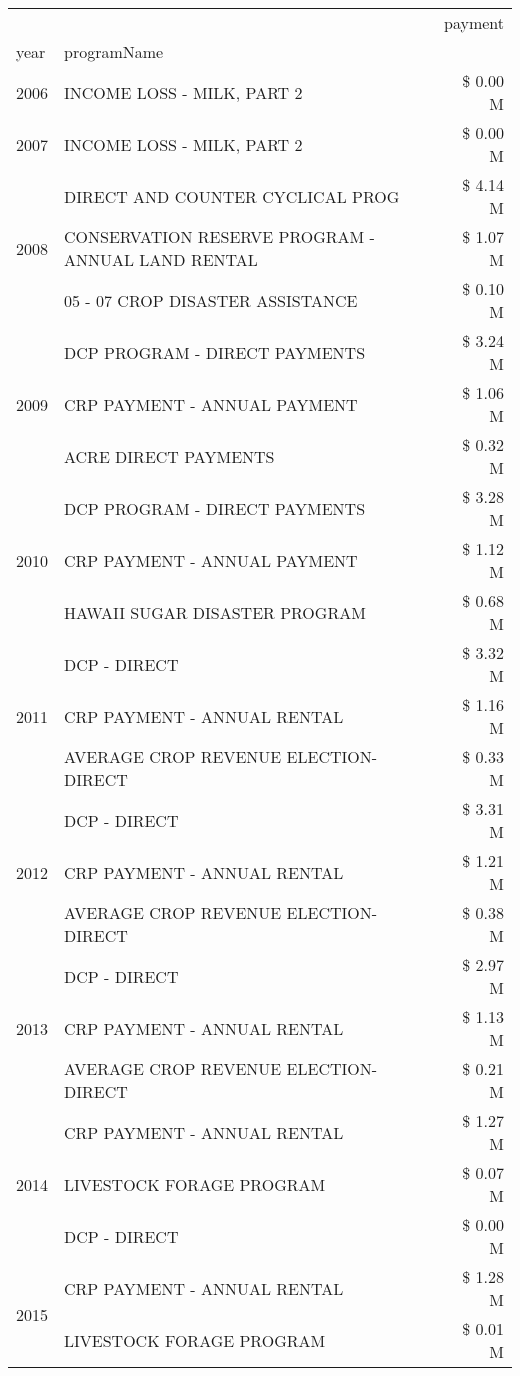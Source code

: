 \begin{tabular}{llr}
\toprule
 &  & payment \\
year & programName &  \\
\midrule
2006 & INCOME LOSS - MILK, PART 2 & \$ 0.00 M \\
\cline{1-3}
2007 & INCOME LOSS - MILK, PART 2 & \$ 0.00 M \\
\cline{1-3}
\multirow[t]{3}{*}{2008} & DIRECT AND COUNTER CYCLICAL PROG & \$ 4.14 M \\
 & CONSERVATION RESERVE PROGRAM - ANNUAL LAND RENTAL & \$ 1.07 M \\
 & 05 - 07 CROP DISASTER ASSISTANCE & \$ 0.10 M \\
\cline{1-3}
\multirow[t]{3}{*}{2009} & DCP PROGRAM - DIRECT PAYMENTS & \$ 3.24 M \\
 & CRP PAYMENT - ANNUAL PAYMENT & \$ 1.06 M \\
 & ACRE DIRECT PAYMENTS & \$ 0.32 M \\
\cline{1-3}
\multirow[t]{3}{*}{2010} & DCP PROGRAM - DIRECT PAYMENTS & \$ 3.28 M \\
 & CRP PAYMENT - ANNUAL PAYMENT & \$ 1.12 M \\
 & HAWAII SUGAR DISASTER PROGRAM & \$ 0.68 M \\
\cline{1-3}
\multirow[t]{3}{*}{2011} & DCP - DIRECT & \$ 3.32 M \\
 & CRP PAYMENT - ANNUAL RENTAL & \$ 1.16 M \\
 & AVERAGE CROP REVENUE ELECTION-DIRECT & \$ 0.33 M \\
\cline{1-3}
\multirow[t]{3}{*}{2012} & DCP - DIRECT & \$ 3.31 M \\
 & CRP PAYMENT - ANNUAL RENTAL & \$ 1.21 M \\
 & AVERAGE CROP REVENUE ELECTION-DIRECT & \$ 0.38 M \\
\cline{1-3}
\multirow[t]{3}{*}{2013} & DCP - DIRECT & \$ 2.97 M \\
 & CRP PAYMENT - ANNUAL RENTAL & \$ 1.13 M \\
 & AVERAGE CROP REVENUE ELECTION-DIRECT & \$ 0.21 M \\
\cline{1-3}
\multirow[t]{3}{*}{2014} & CRP PAYMENT - ANNUAL RENTAL & \$ 1.27 M \\
 & LIVESTOCK FORAGE PROGRAM & \$ 0.07 M \\
 & DCP - DIRECT & \$ 0.00 M \\
\cline{1-3}
\multirow[t]{2}{*}{2015} & CRP PAYMENT - ANNUAL RENTAL & \$ 1.28 M \\
 & LIVESTOCK FORAGE PROGRAM & \$ 0.01 M \\

\end{tabular}

